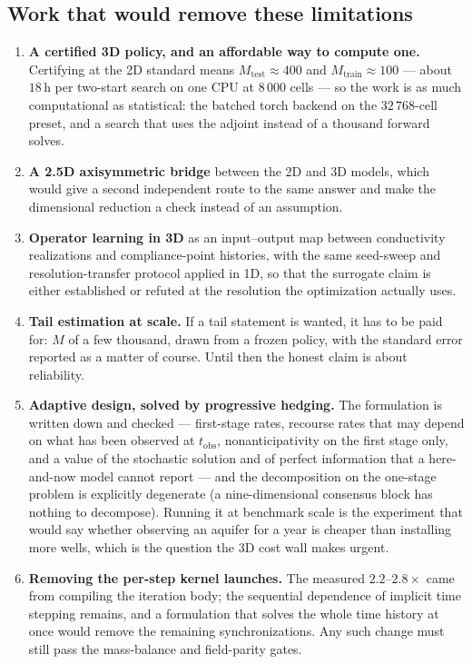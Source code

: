 \subsection{Work that would remove these limitations}

\begin{enumerate}
  \item \textbf{A certified 3D policy, and an affordable way to compute one.}
        Certifying at the 2D standard means $M_{\text{test}}\approx400$ and
        $M_{\text{train}}\approx100$ --- about $18$\,h per two-start search on
        one CPU at $8\,000$ cells --- so the work is as much computational as
        statistical: the batched torch backend on the $32\,768$-cell preset, and
        a search that uses the adjoint instead of a thousand forward solves.
  \item \textbf{A 2.5D axisymmetric bridge} between the 2D and 3D models, which
        would give a second independent route to the same answer and make the
        dimensional reduction a check instead of an assumption.
  \item \textbf{Operator learning in 3D} as an input--output map between
        conductivity realizations and compliance-point histories, with the same
        seed-sweep and resolution-transfer protocol applied in 1D, so that the
        surrogate claim is either established or refuted at the resolution the
        optimization actually uses.
  \item \textbf{Tail estimation at scale.} If a tail statement is wanted, it has
        to be paid for: $M$ of a few thousand, drawn from a frozen policy, with
        the standard error reported as a matter of course. Until then the honest
        claim is about reliability.
  \item \textbf{Adaptive design, solved by progressive hedging.} The formulation
        is written down and checked --- first-stage rates, recourse rates that may
        depend on what has been observed at $t_{\text{obs}}$, nonanticipativity on
        the first stage only, and a value of the stochastic solution and of perfect
        information that a here-and-now model cannot report --- and the
        decomposition on the one-stage problem is explicitly degenerate (a
        nine-dimensional consensus block has nothing to decompose). Running it at
        benchmark scale is the experiment that would say whether observing an
        aquifer for a year is cheaper than installing more wells, which is the
        question the 3D cost wall makes urgent.
  \item \textbf{Removing the per-step kernel launches.} The measured $2.2$--$2.8\times$
        came from compiling the iteration body; the sequential dependence of
        implicit time stepping remains, and a formulation that solves the whole
        time history at once would remove the remaining synchronizations. Any
        such change must still pass the mass-balance and field-parity gates.
\end{enumerate}

